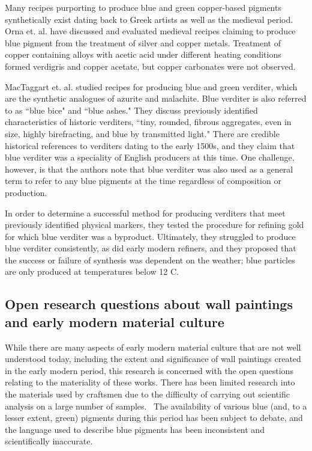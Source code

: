 Many recipes purporting to produce blue and green copper-based pigments synthetically exist dating back to Greek artists as well as the medieval period.~\autocite{mappae_clavicula,Orna_literature,Orna_silver,Barnett} Orna et. al. have discussed and evaluated medieval recipes claiming to produce blue pigment from the treatment of silver and copper metals. Treatment of copper containing alloys with acetic acid under different heating conditions formed verdigris and copper acetate, but copper carbonates were not observed.~\autocite{Orna_literature,Orna_silver}

MacTaggart et. al. studied recipes for producing blue and green verditer, which are the synthetic analogues of azurite and malachite. Blue verditer is also referred to as ``blue bice" and ``blue ashes." They discuss previously identified characteristics of historic verditers, ``tiny, rounded, fibrous aggregates, even in size, highly birefracting, and blue by transmitted light." There are credible historical references to verditers dating to the early 1500s, and they claim that blue verditer was a speciality of English producers at this time. One challenge, however, is that the authors note that blue verditer was also used as a general term to refer to any blue pigments at the time regardless of composition or production. 

In order to determine a successful method for producing verditers that meet previously identified physical markers, they tested the procedure for refining gold for which blue verditer was a byproduct. Ultimately, they struggled to produce blue verditer consistently, as did early modern refiners, and they proposed that the success or failure of synthesis was dependent on the weather; blue particles are only produced at temperatures below 12 \textdegree C.~\autocite{MacTaggart}

\subsection[Open research questions about wall paintings]{Open research questions about wall paintings and early modern material culture}
\label{subsection1.1.3}

While there are many aspects of early modern material culture that are not well understood today, including the extent and significance of wall paintings created in the early modern period, this research is concerned with the open questions relating to the materiality of these works. There has been limited research into the materials used by craftsmen due to the difficulty of carrying out scientific analysis on a large number of samples.~\autocite{Baird_thesis, Davies_book} The availability of various blue (and, to a lesser extent, green) pigments during this period has been subject to debate, and the language used to describe blue pigments has been inconsistent and scientifically inaccurate.~\autocite{Harley} 

